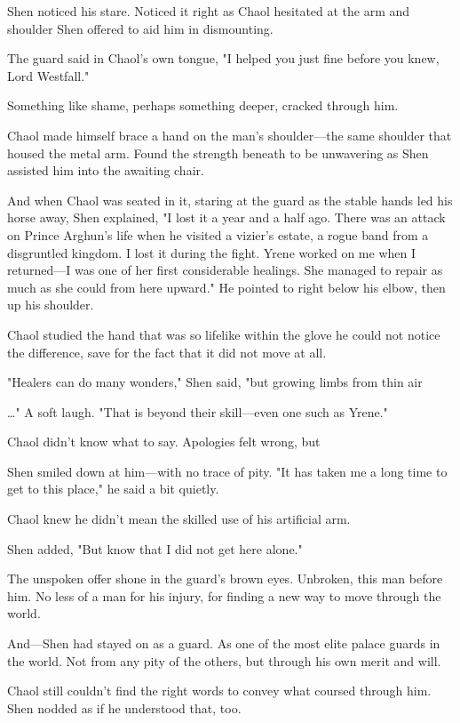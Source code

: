 Shen noticed his stare. Noticed it right as Chaol hesitated at the arm and shoulder Shen offered to aid him in dismounting.

The guard said in Chaol's own tongue, "I helped you just fine before you knew, Lord Westfall."

Something like shame, perhaps something deeper, cracked through him.

Chaol made himself brace a hand on the man's shoulder---the same shoulder that housed the metal arm. Found the strength beneath to be unwavering as Shen assisted him into the awaiting chair.

And when Chaol was seated in it, staring at the guard as the stable hands led his horse away, Shen explained, "I lost it a year and a half ago. There was an attack on Prince Arghun's life when he visited a vizier's estate, a rogue band from a disgruntled kingdom. I lost it during the fight. Yrene worked on me when I returned---I was one of her first considerable healings. She managed to repair as much as she could from here upward." He pointed to right below his elbow, then up his shoulder.

Chaol studied the hand that was so lifelike within the glove he could not notice the difference, save for the fact that it did not move at all.

"Healers can do many wonders," Shen said, "but growing limbs from thin air

\ldots" A soft laugh. "That is beyond their skill---even one such as Yrene."

Chaol didn't know what to say. Apologies felt wrong, but 

Shen smiled down at him---with no trace of pity. "It has taken me a long time to get to this place," he said a bit quietly.

Chaol knew he didn't mean the skilled use of his artificial arm.

Shen added, "But know that I did not get here alone."

The unspoken offer shone in the guard's brown eyes. Unbroken, this man before him. No less of a man for his injury, for finding a new way to move through the world.

And---Shen had stayed on as a guard. As one of the most elite palace guards in the world. Not from any pity of the others, but through his own merit and will.

Chaol still couldn't find the right words to convey what coursed through him. Shen nodded as if he understood that, too.

